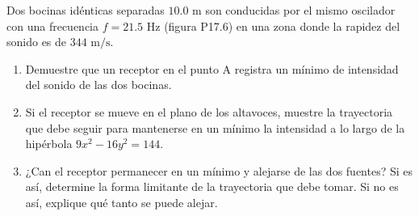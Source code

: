 \item Dos bocinas idénticas separadas $10.0\text{ m}$ son conducidas por el mismo oscilador con una frecuencia $f = 21.5\text{ Hz}$ (figura P17.6) en una zona donde la rapidez del sonido es de $344\text{ m/s}$.
\begin{enumerate}
    \item Demuestre que un receptor en el punto A registra un mínimo de intensidad del sonido de las dos bocinas.
    \item Si el receptor se mueve en el plano de los altavoces, muestre la trayectoria que debe seguir para mantenerse en un mínimo la intensidad a lo largo de la hipérbola $9x^2 - 16y^2 = 144$.
    \item ¿Can el receptor permanecer en un mínimo y alejarse de las dos fuentes? Si es así, determine la forma limitante de la trayectoria que debe tomar. Si no es así, explique qué tanto se puede alejar.
\end{enumerate}